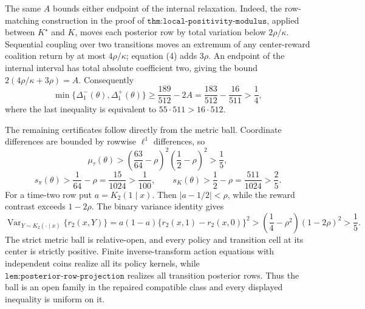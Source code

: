 The same \(A\) bounds either endpoint of the internal relaxation.  Indeed, the row-matching construction in the proof of \(\texttt{thm:local-positivity-modulus}\), applied between \(K^\star\) and \(K\), moves each posterior row by total variation below \(2\rho/\kappa\).  Sequential coupling over two transitions moves an extremum of any center-reward coalition return by at most \(4\rho/\kappa\); equation (4) adds \(3\rho\).  An endpoint of the internal interval has total absolute coefficient two, giving the bound \(2(4\rho/\kappa+3\rho)=A\).  Consequently
\[
 \min\{\Delta_1^-(\theta),\Delta_1^+(\theta)\}
 \ge\frac{189}{512}-2A
 =\frac{183}{512}-\frac{16}{511}>\frac14, \tag{6}
\]
where the last inequality is equivalent to \(55\cdot511>16\cdot512\).

The remaining certificates follow directly from the metric ball.  Coordinate differences are bounded by rowwise \(\ell^1\) differences, so
\[
 \mu_\tau(\theta)>\left(\frac{63}{64}-\rho\right)^2
 \left(\frac12-\rho\right)^2>\frac15,
\]
\[
 s_\pi(\theta)>\frac1{64}-\rho=\frac{15}{1024}>\frac1{100},
 \qquad
 s_K(\theta)>\frac12-\rho=\frac{511}{1024}>\frac25.
\]
For a time-two row put \(a=K_2(1\mid x)\).  Then \(|a-1/2|<\rho\), while the reward contrast exceeds \(1-2\rho\).  The binary variance identity gives
\[
 \operatorname{Var}_{Y\sim K_2(\cdot\mid x)}\{r_2(x,Y)\}
 =a(1-a)\{r_2(x,1)-r_2(x,0)\}^2
 >\left(\frac14-\rho^2\right)(1-2\rho)^2>\frac15.
\]
The strict metric ball is relative-open, and every policy and transition cell at its center is strictly positive.  Finite inverse-transform action equations with independent coins realize all its policy kernels, while \(\texttt{lem:posterior-row-projection}\) realizes all transition posterior rows.  Thus the ball is an open family in the repaired compatible class and every displayed inequality is uniform on it.